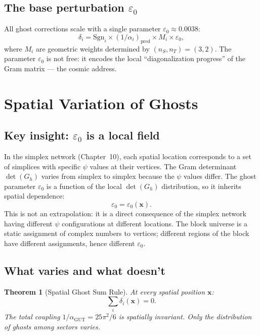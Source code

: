 \documentclass[12pt]{article}
\newtheorem{theorem}{Theorem}[section]
\theoremstyle{remark}
\begin{document}
\subsection{The base perturbation $\varepsilon_0$}

All ghost corrections scale with a single parameter $\varepsilon_0 \approx 0.0038$:
\begin{equation}
\delta_i = \text{Sgn}_i \times (1/\alpha_i)_\text{pred} \times M_i \times \varepsilon_0,
\end{equation}
where $M_i$ are geometric weights determined by $(n_S, n_T) = (3, 2)$. The parameter $\varepsilon_0$ is not free: it encodes the local ``diagonalization progress'' of the Gram matrix --- the cosmic address.

\section{Spatial Variation of Ghosts}

\subsection{Key insight: $\varepsilon_0$ is a local field}

In the simplex network (Chapter~10), each spatial location corresponds to a set of simplices with specific $\psi$ values at their vertices. The Gram determinant $\det(G_h)$ varies from simplex to simplex because the $\psi$ values differ. The ghost parameter $\varepsilon_0$ is a function of the local $\det(G_h)$ distribution, so it inherits spatial dependence:
\begin{equation}
\varepsilon_0 = \varepsilon_0(\mathbf{x}).
\end{equation}
This is not an extrapolation: it is a direct consequence of the simplex network having different $\psi$ configurations at different locations. The block universe is a static assignment of complex numbers to vertices; different regions of the block have different assignments, hence different $\varepsilon_0$.

\subsection{What varies and what doesn't}

\begin{theorem}[Spatial Ghost Sum Rule]
At every spatial position $\mathbf{x}$:
\begin{equation}
\sum_i \delta_i(\mathbf{x}) = 0.
\end{equation}
The total coupling $1/\alpha_\text{GUT} = 25\pi^2/6$ is spatially invariant. Only the distribution of ghosts among sectors varies.
\end{theorem}
\end{document}
